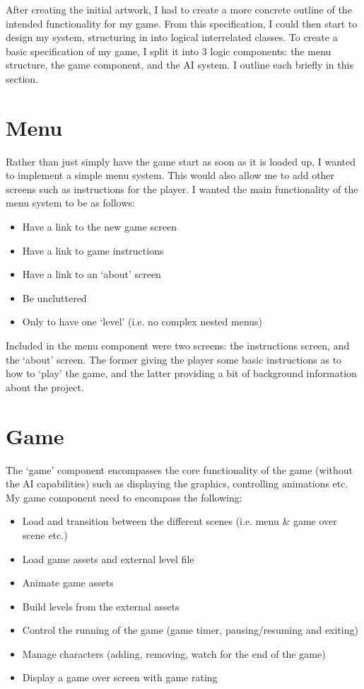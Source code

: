 \documentclass[a4paper,oneside]{report}
\begin{document}
After creating the initial artwork, I had to create a more concrete outline of the intended functionality for my game. From this specification, I could then start to design my system, structuring in into logical interrelated classes. To create a basic specification of my game, I split it into 3 logic components: the menu structure, the game component, and the AI system. I outline each briefly in this section.

\section{Menu}

Rather than just simply have the game start as soon as it is loaded up, I wanted to implement a simple menu system. This would also allow me to add other screens such as instructions for the player. I wanted the main functionality of the menu system to be as follows:

\begin{itemize}
	\item Have a link to the new game screen
	\item Have a link to game instructions
	\item Have a link to an `about' screen
	\item Be uncluttered
	\item Only to have one `level' (i.e. no complex nested menus)
\end{itemize}

Included in the menu component were two screens: the instructions screen, and the `about' screen. The former giving the player some basic instructions as to how to `play' the game, and the latter providing a bit of background information about the project.

\section{Game}

The `game' component encompasses the core functionality of the game (without the AI capabilities) such as displaying the graphics, controlling animations etc. My game component need to encompass the following:

\begin{itemize}
	\item Load and transition between the different scenes (i.e. menu \& game over scene etc.)
	\item Load game assets and external level file
	\item Animate game assets
	\item Build levels from the external assets
	\item Control the running of the game (game timer, pausing/resuming and exiting)
	\item Manage characters (adding, removing, watch for the end of the game)
	\item Display a game over screen with game rating
\end{itemize}
\end{document}

